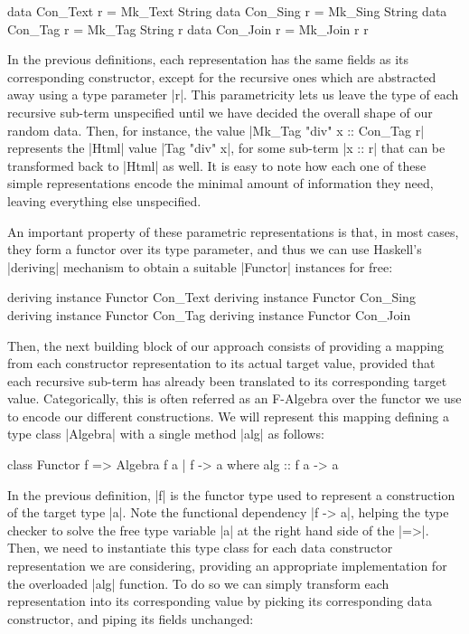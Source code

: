 \begin{code}
data Con_Text   r = Mk_Text  String
data Con_Sing   r = Mk_Sing  String
data Con_Tag    r = Mk_Tag   String r
data Con_Join   r = Mk_Join  r r
\end{code}
%
In the previous definitions, each representation has the same fields as its
corresponding constructor, except for the recursive ones which are abstracted
away using a type parameter |r|.
%
This parametricity lets us leave the type of each recursive sub-term unspecified
until we have decided the overall shape of our random data.
%
Then, for instance, the value |Mk_Tag "div" x :: Con_Tag r| represents the
|Html| value |Tag "div" x|, for some sub-term |x :: r| that can be transformed
back to |Html| as well.
%
It is easy to note how each one of these simple representations encode the
minimal amount of information they need, leaving everything else unspecified.

An important property of these parametric representations is that, in most
cases, they form a functor over its type parameter, and thus we can use
Haskell's |deriving| mechanism to obtain a suitable |Functor| instances for
free:

\begin{code}
deriving instance Functor Con_Text
deriving instance Functor Con_Sing
deriving instance Functor Con_Tag
deriving instance Functor Con_Join
\end{code}


%
Then, the next building block of our approach consists of providing a mapping
from each constructor representation to its actual target value, provided that
each recursive sub-term has already been translated to its corresponding target
value.
%
Categorically, this is often referred as an F-Algebra over the functor we use to
encode our different constructions.
%
We will represent this mapping defining a type class |Algebra| with a single
method |alg| as follows:

\begin{code}
class Functor f => Algebra f a | f -> a where
  alg :: f a -> a
\end{code}
%
In the previous definition, |f| is the functor type used to represent a
construction of the target type |a|.
%
Note the functional dependency |f -> a|, helping the type checker to solve the
free type variable |a| at the right hand side of the |=>|.
%
%
Then, we need to instantiate this type class for each data constructor
representation we are considering, providing an appropriate implementation for
the overloaded |alg| function.
%
To do so we can simply transform each representation into its corresponding
value by picking its corresponding data constructor, and piping its fields
unchanged:

